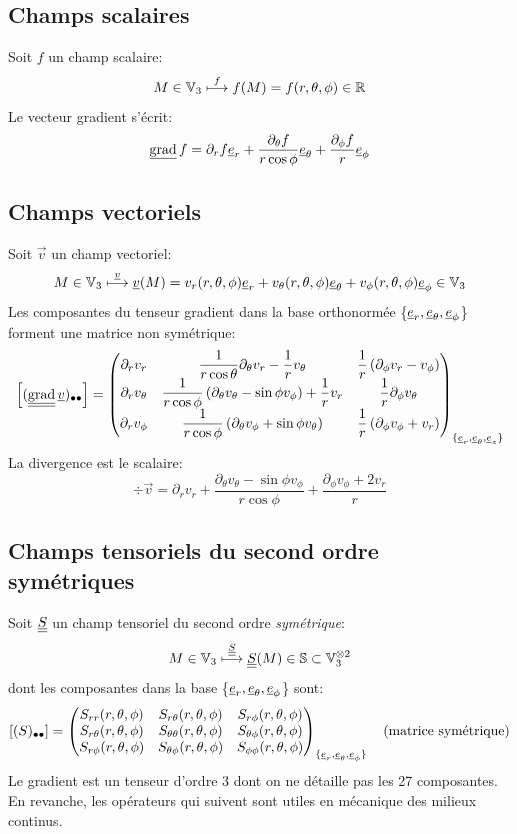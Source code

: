 \documentclass[10pt]{book}
\newcommand{\vgrad}{\vec{\text{grad}}\,}
\begin{document}
\begin{appendices}
\subsection{Champs scalaires}
Soit $f$ un champ scalaire:
$$M\in \mathbb{V}_{3}\overset{f}{\longmapsto}f(M)=f(r,\theta,\phi)\in \mathbb{R}$$
Le vecteur gradient s'écrit:
$$\vgrad f=\partial_{r}f\er+\dfrac{\partial_{\theta}f}{r\cos\phi}\etheta+\frac{\partial_{\phi}f}{r}\e_{\phi}$$
\subsection{Champs vectoriels}
Soit $\vec{v}$ un champ vectoriel:
$$M\in \mathbb{V}_{3}\overset{\underline{v}}{\longmapsto}\underline{v}(M)=v_{r}(r,\theta,\phi)\underline{e}_{r} +v_{\theta}(r,\theta,\phi)\underline{e}_{\theta}+v_{\phi}(r,\theta,\phi)\underline{e}_{\phi}\in \mathbb{V}_{3}$$
Les composantes du tenseur gradient dans la base orthonormée \{$\underline{e}_{r},\underline{e}_{\theta}, \underline{e}_{\phi}$\} forment une matrice non symétrique:
\begin{equation}
\left[(\tgrad \vec{v})_{\bullet\bullet}\right]=\begin{pmatrix}
\partial_{r}v_{r} & \dfrac{1}{r\cos\theta}\partial_{\theta}v_{r}-\dfrac{1}{r}v_{\theta} & \dfrac{1}{r}\left(\partial_{\phi}v_{r}-v_{\phi}\right)\\
\partial_{r}v_{\theta} & \dfrac{1}{r\cos\phi}\left(\partial_{\theta}v_{\theta}-\sin\phi v_{\phi}\right)+\dfrac{1}{r}v_{r} & \dfrac{1}{r}\partial_{\phi}v_{\theta}\\
\partial_{r}v_{\phi} & \dfrac{1}{r\cos\phi}\left(\partial_{\theta}v_{\phi}+\sin\phi v_{\theta}\right) & \dfrac{1}{r}\left(\partial_{\phi}v_{\phi}+v_{r}\right)\\
\end{pmatrix}_{\{\er,\etheta,\ez\}}
\label{eq:formulaire_grad_sph_vec}
\end{equation}
La divergence est le scalaire:
$$\div\vec{v}=\partial_{r}v_{r}+\frac{\partial_{\theta}v_{\theta}-\sin\phi v_{\phi}}{r\cos\phi}+\frac{\partial_{\phi}v_{\phi}+2v_{r}}{r}$$
\subsection{Champs tensoriels du second ordre symétriques}
Soit $\underline{\underline{S}}$ un champ tensoriel du second ordre \emph{symétrique}:
$$M\in \mathbb{V}_{3}\overset{\underline{\underline{S}}}{\longmapsto} \underline{\underline{S}}(M)\in \mathbb{S}\subset \mathbb{V}_{3}^{\otimes 2}$$
dont les composantes dans la base \{$\underline{e}_{r},\underline{e}_{\theta}, \underline{e}_{\phi}$\} sont:
$$[(S)_{\bullet\bullet}]=\begin{pmatrix}
S_{rr}(r,\theta,\phi) & S_{r\theta}(r, \theta,\phi) & S_{r\phi}(r, \theta,\phi)\\
S_{r\theta}(r, \theta,\phi) & S_{\theta\theta}(r, \theta,\phi) & S_{\theta\phi}(r, \theta,\phi)\\
S_{r\phi}(r, \theta,\phi) & S_{\theta\phi}(r, \theta,\phi) & S_{\phi\phi}(r, \theta,\phi)
\end{pmatrix}_{\{\underline{e}_{r},\underline{e}_{\theta},\underline{e}_{\phi}\}} \quad \text{(matrice symétrique)}$$
Le gradient est un tenseur d'ordre 3 dont on ne détaille pas les 27 composantes. En revanche, les opérateurs qui suivent sont utiles en mécanique des milieux continus.


\end{appendices}
\end{document}
